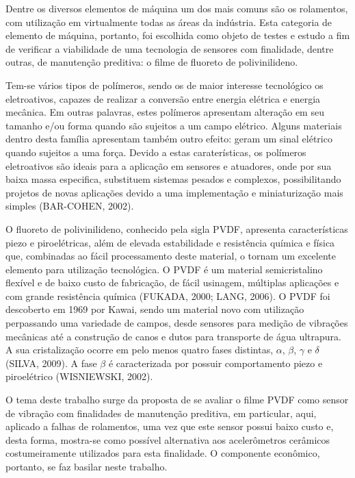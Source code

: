\documentclass[
	12pt,				
	oneside,			
	a4paper,			
	english,			
	brazil,			
	]{abntex2ppgsi}
\begin{document}
Dentre os diversos elementos de máquina um dos mais comuns são os rolamentos, com utilização em virtualmente todas as áreas da indústria. Esta categoria de elemento de máquina, portanto, foi escolhida como objeto de testes e estudo a fim de verificar a viabilidade de uma tecnologia  de sensores com finalidade, dentre outras, de manutenção preditiva: o filme de fluoreto de polivinilideno. 

Tem-se vários tipos de polímeros, sendo os de maior interesse tecnológico os eletroativos, capazes de realizar a conversão entre energia elétrica e energia mecânica. Em outras palavras, estes polímeros apresentam alteração em seu tamanho e/ou forma quando são sujeitos a um campo elétrico. Alguns  materiais dentro desta família apresentam também outro efeito: geram um sinal elétrico quando sujeitos a uma força. Devido a estas caraterísticas, os polímeros eletroativos são ideais para a aplicação em sensores e atuadores, onde por sua baixa massa especifica, substituem sistemas pesados e complexos, possibilitando projetos de novas aplicações devido a uma implementação e miniaturização mais simples (BAR-COHEN, 2002).

O fluoreto de polivinilideno, conhecido pela sigla PVDF, apresenta características piezo e piroelétricas, além de elevada estabilidade e resistência química e física que, combinadas ao fácil processamento deste material, o tornam um excelente elemento para utilização tecnológica. O PVDF é um material semicristalino flexível e de baixo custo de fabricação, de fácil usinagem, múltiplas aplicações e com grande resistência química (FUKADA, 2000; LANG, 2006). O PVDF foi descoberto em 1969 por Kawai, sendo um material novo com utilização perpassando uma variedade de campos, desde sensores para medição de vibrações mecânicas até a construção de canos e dutos para transporte de água ultrapura. A sua cristalização ocorre em pelo menos quatro fases distintas, $\alpha$, $\beta$, $\gamma$ e $\delta$ (SILVA, 2009). A fase $\beta$ é caracterizada por possuir comportamento piezo e piroelétrico (WISNIEWSKI, 2002).

O tema deste trabalho surge da proposta de se avaliar o filme PVDF como sensor de vibração com finalidades de manutenção preditiva, em particular, aqui, aplicado a falhas de rolamentos, uma vez que este sensor possui baixo custo e, desta forma, mostra-se como possível alternativa aos acelerômetros cerâmicos costumeiramente utilizados para esta finalidade. O componente econômico, portanto, se faz basilar neste trabalho. 
\end{document}
